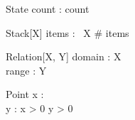 \documentclass[a4paper,10pt,fleqn]{article}
\begin{document}
\begin{schema}{State}
count : \nat
\where
count 
\end{schema}

\begin{schema}{Stack}[X]
items : \seq~X
\where
\# items 
\end{schema}

\begin{schema}{Relation}[X, Y]
domain : \power X \\
range : \power Y
\end{schema}

\begin{schema}{Point}
x : \nat \\
y : \nat
\where
x > 0 \land y > 0
\end{schema}
\end{document}
